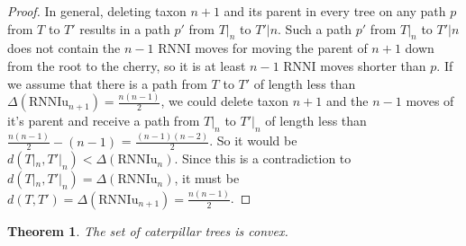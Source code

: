 \documentclass[11pt, a4paper]{article}
\newcommand{\rnni}{\mathrm{RNNI}}
\newcommand{\rnniu}{\mathrm{RNNIu}}
\newtheorem{theorem}[definition]{Theorem}
\begin{document}
\begin{proof}
    In general, deleting taxon $n+1$ and its parent in every tree on any path $p$ from $T$ to $T'$ results in a path $p'$ from $T|_n$ to $T'|n$.
    Such a path $p'$ from $T|_n$ to $T'|n$ does not contain the $n-1$ $\rnni$ moves for moving the parent of $n+1$ down from the root to the cherry, so it is at least $n-1$ $\rnni$ moves shorter than $p$.
    If we assume that there is a path from $T$ to $T'$ of length less than $\Delta(\rnniu_{n+1}) = \frac{n(n-1)}{2}$, we could delete taxon $n+1$ and the $n-1$ moves of it's parent and receive a path from $T|_n$ to $T'|_n$ of length less than $\frac{n(n-1)}{2} - (n-1)$ = $\frac{(n-1)(n-2)}{2}$.
    So it would be $d(T|_n, T'|_n) < \Delta(\rnniu_n)$.
    Since this is a contradiction to $d(T|_n, T'|_n) = \Delta(\rnniu_n)$, it must be $d(T,T') = \Delta(\rnniu_{n+1}) = \frac{n(n-1)}{2} $.

\end{proof}

\begin{theorem}
    The set of caterpillar trees is convex.
\end{theorem}
\end{document}
